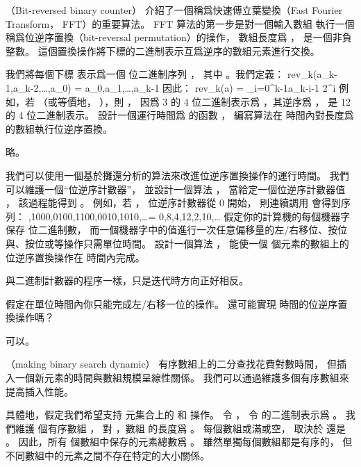 \startsubject[
  title={Problems},
]

\startPROBLEM
（Bit-reversed binary counter）
介紹了一個稱爲快速傅立葉變換（Fast Fourier Transform， FFT）的重要算法。
 FFT 算法的第一步是對一個輸入數組  執行一個稱爲{\EMP 位逆序置換}（bit-reversal permutation）的操作，
數組長度爲 ，  是一個非負整數。
這個置換操作將下標的二進制表示互爲逆序的數組元素進行交換。

我們將每個下標  表示爲一個  位二進制序列 ，
其中 。我們定義：
\startformula
rev_k(\langle a_{k-1},a_{k-2},\ldots,a_0\rangle) = \langle a_0,a_1,\ldots,a_{k-1}\rangle
\stopformula
因此：
\startformula
rev_k(a) = \sum_{i=0}^{k-1}a_{k-i-1} 2^i
\stopformula
例如，若 （或等價地， ），則 ，
因爲 3 的 4 位二進制表示爲 ，其逆序爲 ，
是 12 的 4 位二進制表示。
\startigBase[a]
\startitem
設計一個運行時間爲  的函數 ，
編寫算法在  時間內對長度爲  的數組執行位逆序置換。
\stopitem

\startANSWER
略。
\stopANSWER
\stopigBase

我們可以使用一個基於攤還分析的算法來改進位逆序置換操作的運行時間。
我們可以維護一個“位逆序計數器”，
並設計一個算法 ，
當給定一個位逆序計數器值 ，
該過程能得到 。
例如，若 ，
位逆序計數器從 0 開始，
則連續調用  會得到序列：
,1000,0100,1100,0010,1010,\ldots = 0,8,4,12,2,10,\ldots
\stopformula
\startigBase[a,continue]
\startitem
假定你的計算機的每個機器字保存  位二進制數，
而一個機器字中的值進行一次任意偏移量的左/右移位、按位與、按位或等操作只需單位時間。
設計一個算法 ，
能使一個  個元素的數組上的位逆序置換操作在  時間內完成。
\stopitem

\startANSWER
與二進制計數器的程序一樣，只是迭代時方向正好相反。
\stopANSWER

\startitem
假定在單位時間內你只能完成左/右移一位的操作。
還可能實現  時間的位逆序置換操作嗎？
\stopitem

\startANSWER
可以。
\stopANSWER
\stopigBase
\stopPROBLEM

\startPROBLEM
（making binary search dynamic）
有序數組上的二分查找花費對數時間，
但插入一個新元素的時間與數組規模呈線性關係。
我們可以通過維護多個有序數組來提高插入性能。

具體地，假定我們希望支持  元集合上的  和  操作。
令 ，
令  的二進制表示爲 。
我們維護  個有序數組 ，
對 ，數組  的長度爲 。
每個數組或滿或空，
取決於  還是 。
因此，所有  個數組中保存的元素總數爲 。
雖然單獨每個數組都是有序的，
但不同數組中的元素之間不存在特定的大小關係。

